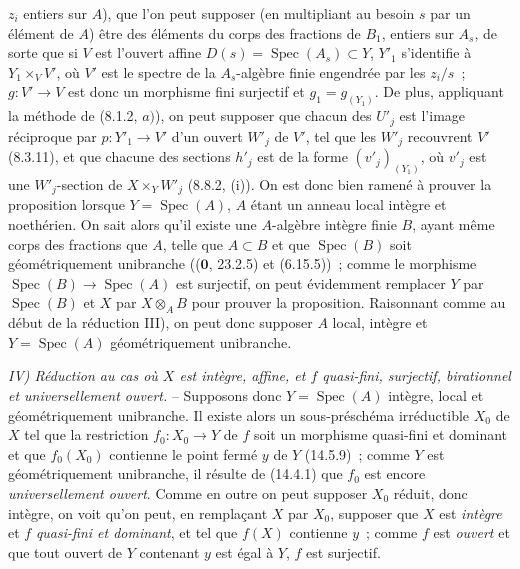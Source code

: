 
$z_i$ entiers sur $A$), que l'on peut supposer (en multipliant au besoin $s$ par un
élément de $A$) être des éléments du corps des fractions de $B_1$, entiers sur
$A_s$, de sorte que si $V$ est l'ouvert affine $D(s)=\operatorname{Spec}(A_s)\subset Y$, $Y'_1$
s'identifie à $Y_1\times_V V'$, où $V'$ est le spectre de la $A_s$-algèbre finie
engendrée par les $z_i/s$~; $g:V'\to V$ est donc un morphisme fini surjectif et
$g_1=g_{(Y_1)}$. De plus, appliquant la méthode de (8.1.2, $a)$), on peut supposer
que chacun des $U'_j$ est l'image réciproque par $p:Y'_1\to V'$ d'un ouvert $W'_j$
de $V'$, tel que les $W'_j$ recouvrent $V'$ (8.3.11), et que chacune des sections
$h'_j$ est de la forme $(v'_j)_{(Y_1)}$, où $v'_j$ est une $W'_j$-section de
$X\times_Y W'_j$ (8.8.2, (i)). On est donc bien ramené à prouver la proposition
lorsque $Y=\operatorname{Spec}(A)$, $A$ étant un anneau local intègre et noethérien. On sait alors
qu'il existe une $A$-algèbre intègre finie $B$, ayant même corps des fractions que
$A$, telle que $A\subset B$ et que $\operatorname{Spec}(B)$ soit géométriquement unibranche
(($\mathbf 0$, 23.2.5) et (6.15.5))~; comme le morphisme
$\operatorname{Spec}(B)\to\operatorname{Spec}(A)$ est surjectif, on peut évidemment remplacer $Y$ par
$\operatorname{Spec}(B)$ et $X$ par $X\otimes_A B$ pour prouver la proposition. Raisonnant comme
au début de la réduction III), on peut donc supposer $A$ local, intègre et
$Y=\operatorname{Spec}(A)$ géométriquement unibranche.

\emph{IV) Réduction au cas où $X$ est intègre, affine, et $f$ quasi-fini,
surjectif, birationnel et universellement ouvert.} -- Supposons donc $Y=\operatorname{Spec}(A)$
intègre, local et géométriquement unibranche. Il existe alors un sous-préschéma
irréductible $X_0$ de $X$ tel que la restriction $f_0:X_0\to Y$ de $f$ soit un
morphisme quasi-fini et dominant et que $f_0(X_0)$ contienne le point fermé $y$ de
$Y$ (14.5.9)~; comme $Y$ est géométriquement unibranche, il résulte de (14.4.1) que
$f_0$ est encore \emph{universellement ouvert}. Comme en outre on peut supposer
$X_0$ réduit, donc intègre, on voit qu'on peut, en remplaçant $X$ par $X_0$,
supposer que $X$ est \emph{intègre} et $f$ \emph{quasi-fini et dominant}, et tel que
$f(X)$ contienne $y$~; comme $f$ est \emph{ouvert} et que tout ouvert de $Y$
contenant $y$ est égal à $Y$, $f$ est surjectif.

